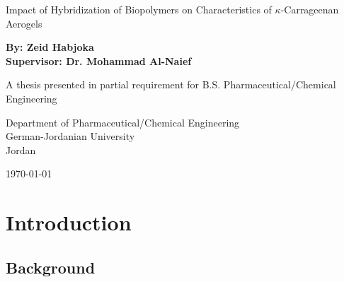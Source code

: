 \documentclass[a4paper,12pt]{article}
\begin{document}

\begin{titlepage} 
  \begin{center}
  
    \vspace*{1 in} 
    
    \sffamily \Large Impact of Hybridization of Biopolymers on Characteristics of $\kappa$-Carrageenan Aerogels \\
    
    \vspace*{1 in} 
    
    \large \textbf{By: Zeid Habjoka} \\
    \large \textbf{Supervisor: Dr. Mohammad Al-Naief} \\
    
    \vspace*{1 in} 
    
    \large A thesis presented in partial requirement for B.S. Pharmaceutical/Chemical Engineering \\
    
    \vspace*{1 in}
    
    \large Department of Pharmaceutical/Chemical Engineering \\
    \large German-Jordanian University \\
    \large Jordan \\
    
    \vspace*{1 in}
    
    \large \today
    
    \vfill
    
  \end{center}
\end{titlepage}

\newpage

\tableofcontents

\vfill

\newpage
  

\section{Introduction}


\subsection{Background}
\end{document}
